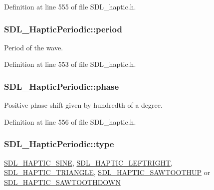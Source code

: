 Definition at line 555 of file S\-D\-L\-\_\-haptic.\-h.

\hypertarget{struct_s_d_l___haptic_periodic_a0e7e105b96308129b248d52b56a2a839}{
\subsubsection[{period}]{ S\-D\-L\-\_\-\-Haptic\-Periodic\-::period}}\label{struct_s_d_l___haptic_periodic_a0e7e105b96308129b248d52b56a2a839}
Period of the wave. 

Definition at line 553 of file S\-D\-L\-\_\-haptic.\-h.

\hypertarget{struct_s_d_l___haptic_periodic_a25e8c6aebc78bd74b9343fa228d25d8f}{
\subsubsection[{phase}]{ S\-D\-L\-\_\-\-Haptic\-Periodic\-::phase}}\label{struct_s_d_l___haptic_periodic_a25e8c6aebc78bd74b9343fa228d25d8f}
Positive phase shift given by hundredth of a degree. 

Definition at line 556 of file S\-D\-L\-\_\-haptic.\-h.

\hypertarget{struct_s_d_l___haptic_periodic_ac53c5725e8cff012e9b90e01b7110869}{
\subsubsection[{type}]{ S\-D\-L\-\_\-\-Haptic\-Periodic\-::type}}\label{struct_s_d_l___haptic_periodic_ac53c5725e8cff012e9b90e01b7110869}
\hyperlink{_s_d_l__haptic_8h_aa6d75adbfcdda5075078e7a2849da5c0}{S\-D\-L\-\_\-\-H\-A\-P\-T\-I\-C\-\_\-\-S\-I\-N\-E}, \hyperlink{_s_d_l__haptic_8h_ae047624d8458ff6400887c37a36f86d3}{S\-D\-L\-\_\-\-H\-A\-P\-T\-I\-C\-\_\-\-L\-E\-F\-T\-R\-I\-G\-H\-T}, \hyperlink{_s_d_l__haptic_8h_ae8123eaa51511507375ba6ef9220fa46}{S\-D\-L\-\_\-\-H\-A\-P\-T\-I\-C\-\_\-\-T\-R\-I\-A\-N\-G\-L\-E}, \hyperlink{_s_d_l__haptic_8h_ab8e3f40f3c2bcee8905d13b634363c3f}{S\-D\-L\-\_\-\-H\-A\-P\-T\-I\-C\-\_\-\-S\-A\-W\-T\-O\-O\-T\-H\-U\-P} or \hyperlink{_s_d_l__haptic_8h_afd64aa747034a7ccf4b55f6246525701}{S\-D\-L\-\_\-\-H\-A\-P\-T\-I\-C\-\_\-\-S\-A\-W\-T\-O\-O\-T\-H\-D\-O\-W\-N} 

